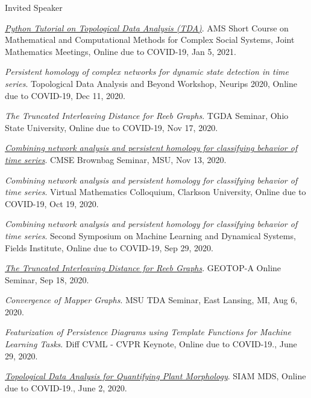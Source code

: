 \documentclass{resume} %
\begin{document}
\begin{rSection}{Invited Speaker}
\begin{etaremune}
\item\emph{\href{https://github.com/lizliz/TDA-Python-Workshop-JMM21}{Python Tutorial on Topological Data Analysis (TDA)}}. AMS Short Course on Mathematical and Computational Methods for Complex Social Systems, Joint Mathematics Meetings, Online due to COVID-19, Jan 5, 2021. 

\item\emph{Persistent homology of complex networks for dynamic state detection in time series}. Topological Data Analysis and Beyond Workshop, Neurips 2020, Online due to COVID-19, Dec 11, 2020. 

\item\emph{The Truncated Interleaving Distance for Reeb Graphs}. TGDA Seminar, Ohio State University, Online due to COVID-19, Nov 17, 2020. 

\item\emph{\href{https://mediaspace.msu.edu/media/t/1_yghdjfiz}{Combining network analysis and persistent homology for classifying behavior of time series}}. CMSE Brownbag Seminar, MSU, Nov 13, 2020. 

\item\emph{Combining network analysis and persistent homology for classifying behavior of time series}. Virtual Mathematics Colloquium, Clarkson University, Online due to COVID-19, Oct 19, 2020. 

\item\emph{Combining network analysis and persistent homology for classifying behavior of time series}. Second Symposium on Machine Learning and Dynamical Systems, Fields Institute, Online due to COVID-19, Sep 29, 2020. 

\item\emph{\href{https://youtu.be/nyO4KQTmwzU}{The Truncated Interleaving Distance for Reeb Graphs}}. GEOTOP-A Online Seminar, Sep 18, 2020. 

\item\emph{Convergence of Mapper Graphs}. MSU TDA Seminar, East Lansing, MI, Aug 6, 2020. 

\item\emph{Featurization of Persistence Diagrams using Template Functions for Machine Learning Tasks}. Diff CVML - CVPR Keynote, Online due to COVID-19., June 29, 2020. 

\item\emph{\href{https://youtu.be/2mscXkz_o4A}{Topological Data Analysis for Quantifying Plant Morphology}}. SIAM MDS, Online due to COVID-19., June 2, 2020. 


\end{etaremune}
\end{rSection}
\end{document}
